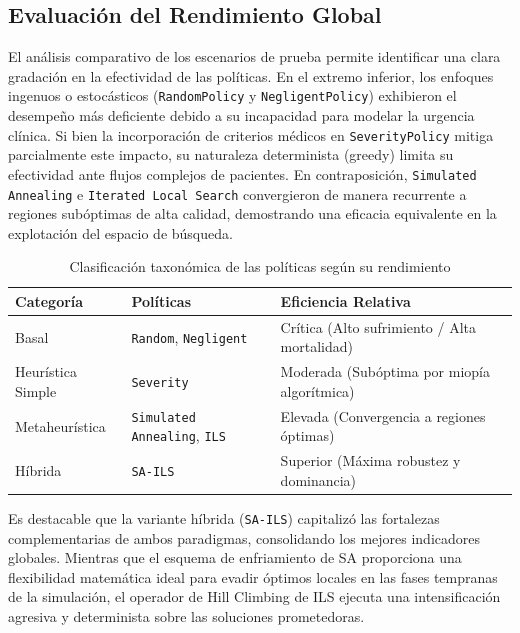 \documentclass[12pt,a4paper]{article}
\begin{document}
\subsection{Evaluación del Rendimiento Global}

El análisis comparativo de los escenarios de prueba permite identificar una clara gradación en la 
efectividad de las políticas. En el extremo inferior, los enfoques ingenuos o estocásticos 
(\texttt{RandomPolicy} y \texttt{NegligentPolicy}) exhibieron el desempeño más deficiente debido a 
su incapacidad para modelar la urgencia clínica. Si bien la incorporación de criterios médicos en 
\texttt{SeverityPolicy} mitiga parcialmente este impacto, su naturaleza determinista (greedy) 
limita su efectividad ante flujos complejos de pacientes. 
En contraposición, \texttt{Simulated Annealing} e \texttt{Iterated Local Search} 
convergieron de manera recurrente a regiones subóptimas de alta calidad, 
demostrando una eficacia equivalente en la explotación del espacio de búsqueda.

\begin{table}[htbp]
\centering
\caption{Clasificación taxonómica de las políticas según su rendimiento}
\label{tab:taxonomia_politicas}
\begin{tabular}{lll}
\hline
\textbf{Categoría} & \textbf{Políticas} & \textbf{Eficiencia Relativa} \\ \hline
Basal & \texttt{Random}, \texttt{Negligent} & Crítica (Alto sufrimiento / Alta mortalidad) \\
Heurística Simple & \texttt{Severity} & Moderada (Subóptima por miopía algorítmica) \\
Metaheurística & \texttt{Simulated Annealing}, \texttt{ILS} & Elevada (Convergencia a regiones óptimas) \\
Híbrida & \texttt{SA-ILS} & Superior (Máxima robustez y dominancia) \\ \hline
\end{tabular}
\end{table}

Es destacable que la variante híbrida (\texttt{SA-ILS}) capitalizó las fortalezas complementarias de ambos paradigmas, 
consolidando los mejores indicadores globales. 
Mientras que el esquema de enfriamiento de SA proporciona una flexibilidad matemática ideal para evadir 
óptimos locales en las fases tempranas de la simulación, el operador de Hill Climbing de 
ILS ejecuta una intensificación agresiva y determinista sobre las soluciones prometedoras.
\end{document}
